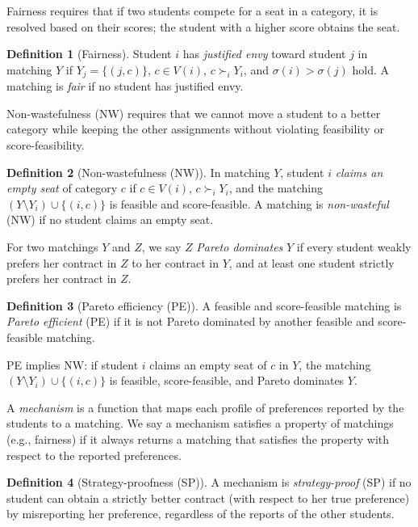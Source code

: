 \documentclass[a4paper,twoside]{article}
\theoremstyle{definition}
\newtheorem{definition}{Definition}
\begin{document}
Fairness requires that if two students compete for a seat in a category, 
it is resolved based on their scores; the student with a higher score obtains the seat.
\begin{definition}[Fairness]
\label{def:fair}
Student $i$ has \emph{justified envy} toward student $j$ in matching $Y$ if
$Y_j=\{(j,c)\}$, $c\in V(i)$, $c\succ_i Y_i$, and $\sigma(i)>\sigma(j)$ hold.
A matching is \emph{fair} if no student has justified envy.
\end{definition}

Non-wastefulness (NW) requires that we cannot move a student to a better category while keeping 
the other assignments without violating feasibility or score-feasibility. 
\begin{definition}[Non-wastefulness (NW)]
\label{def:nw}
In matching $Y$, student $i$ \emph{claims an empty seat} of category $c$ if $c\in V(i)$,
$c\succ_i Y_i$, and the matching $(Y\setminus Y_i)\cup\{(i,c)\}$ is feasible and
score-feasible.
A matching is \emph{non-wasteful} (NW) if no student claims an empty seat.
\end{definition}

For two matchings $Y$ and $Z$, we say $Z$ \emph{Pareto dominates} $Y$ if every student
weakly prefers her contract in $Z$ to her contract in $Y$, and at least one student
strictly prefers her contract in $Z$.

\begin{definition}[Pareto efficiency (PE)]
\label{def:pe}
A feasible and score-feasible matching is \emph{Pareto efficient} (PE) if it is not
Pareto dominated by another feasible and score-feasible matching.
\end{definition}

PE implies NW: if student $i$ claims an empty seat of $c$ in $Y$, the
matching $(Y\setminus Y_i)\cup\{(i,c)\}$ is feasible, score-feasible, and Pareto
dominates $Y$.

A \emph{mechanism} is a function that maps each profile of preferences reported by the
students to a matching.
We say a mechanism satisfies a property of matchings (e.g., fairness) if it always
returns a matching that satisfies the property with respect to the reported preferences.

\begin{definition}[Strategy-proofness (SP)]
\label{def:sp}
A mechanism is \emph{strategy-proof} (SP) if no student can obtain a strictly better
contract (with respect to her true preference) by misreporting her preference, regardless
of the reports of the other students.
\end{definition}
\end{document}
